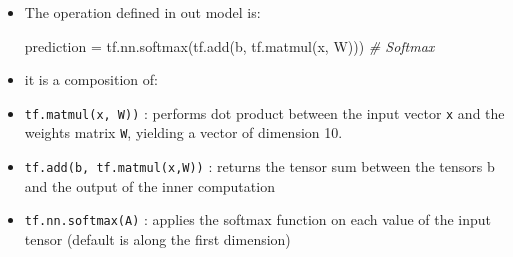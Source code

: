 \documentclass[11pt]{article}
\newenvironment{Shaded}{}{}
\newcommand{\CommentTok}[1]{\textcolor[rgb]{0.38,0.63,0.69}{\textit{{#1}}}}
\newcommand{\NormalTok}[1]{{#1}}
\newcommand{\OperatorTok}[1]{\textcolor[rgb]{0.40,0.40,0.40}{{#1}}}
\begin{document}
    \begin{itemize}
\item
  The operation defined in out model is:

\begin{Shaded}
\begin{Highlighting}[]
\NormalTok{prediction }\OperatorTok{=}\NormalTok{ tf.nn.softmax(tf.add(b, tf.matmul(x, W))) }\CommentTok{# Softmax}
\end{Highlighting}
\end{Shaded}
\item
  it is a composition of:
\item
  \texttt{tf.matmul(x,\ W))} : performs dot product between the input
  vector \texttt{x} and the weights matrix \texttt{W}, yielding a vector
  of dimension 10.
\item
  \texttt{tf.add(b,\ tf.matmul(x,W))} : returns the tensor sum between
  the tensors b and the output of the inner computation
\item
  \texttt{tf.nn.softmax(A)} : applies the softmax function on each value
  of the input tensor (default is along the first dimension)
\end{itemize}
\end{document}

